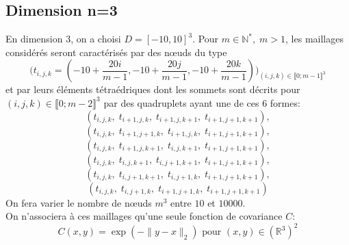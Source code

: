\subsection{Dimension n=3}
\label{choDim3}
En dimension 3, on a choisi $D = [-10,10]^3$. Pour $m \in \mathbb{N}^{*}, \; m > 1$,
les maillages considérés seront caractérisés par des n\oe uds du type
\begin{equation*} \biggl (t_{i,j,k} = (-10 + \frac{20i}{m-1}, -10 + \frac{20j}{m-1}, -10 + \frac{20k}{m-1} )\biggr)_{(i,j,k) \in \llbracket 0;m-1 \rrbracket^3}  \end{equation*}
et par leurs éléments tétraédriques dont les sommets sont décrits pour \\$(i,j,k) \in \llbracket 0;m-2 \rrbracket^3$ par des quadruplets ayant une de ces 6 formes:
\begin{equation*}(t_{i,j,k},\; t_{i+1,j,k},\; t_{i+1,j,k+1},\; t_{i+1,j+1,k+1}) , \end{equation*}
\begin{equation*}(t_{i,j,k},\; t_{i+1,j+1,k}, \;t_{i+1,j,k}, \;t_{i+1,j+1,k+1}) , \end{equation*}
\begin{equation*}(t_{i,j,k},\; t_{i+1,j,k+1},\; t_{i,j,k+1},\; t_{i+1,j+1,k+1}) , \end{equation*}
\begin{equation*}(t_{i,j,k},\; t_{i,j,k+1},\; t_{i,j+1,k+1}, \;t_{i+1,j+1,k+1}) , \end{equation*}
\begin{equation*}(t_{i,j,k},\; t_{i,j+1,k+1},\; t_{i,j+1,k},\; t_{i+1,j+1,k+1}) , \end{equation*}
\begin{equation*}(t_{i,j,k},\; t_{i,j+1,k},\; t_{i+1,j+1,k},\; t_{i+1,j+1,k+1}) \end{equation*}
On fera varier le nombre de n\oe uds $m^3$ entre $10$ et $10000$.\\
On n'associera à ces maillages qu'une seule fonction de covariance $C$:
\begin{equation*} C(x,y) = \exp(-\|y-x\|_2) \text{ pour } (x,y) \in (\mathbb{R}^3)^2 \end{equation*}
\phantom{oyez}

